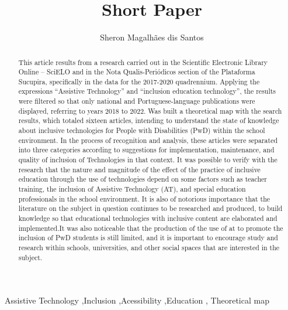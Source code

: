 \documentclass[preprint, 3p,
authoryear]{elsarticle} %
\begin{document}
\begin{frontmatter}

  \title{Short Paper}
    \author[Universidade Federal do Rio Grande]{Sheron Magalhães dis
Santos%
  }
  
  \begin{abstract}
  This article results from a research carried out in the Scientific
  Electronic Library Online -- SciELO and in the Nota Qualis-Periódicos
  section of the Plataforma Sucupira, specifically in the data for the
  2017-2020 quadrennium. Applying the expressions ``Assistive
  Technology'' and ``inclusion education technology'', the results were
  filtered so that only national and Portuguese-language publications
  were displayed, referring to years 2018 to 2022. Was built a
  theoretical map with the search results, which totaled sixteen
  articles, intending to understand the state of knowledge about
  inclusive technologies for People with Disabilities (PwD) within the
  school environment. In the process of recognition and analysis, these
  articles were separated into three categories according to suggestions
  for implementation, maintenance, and quality of inclusion of
  Technologies in that context. It was possible to verify with the
  research that the nature and magnitude of the effect of the practice
  of inclusive education through the use of technologies depend on some
  factors such as teacher training, the inclusion of Assistive
  Technology (AT), and special education professionals in the school
  environment. It is also of notorious importance that the literature on
  the subject in question continues to be researched and produced, to
  build knowledge so that educational technologies with inclusive
  content are elaborated and implemented.It was also noticeable that the
  production of the use of at to promote the inclusion of PwD students
  is still limited, and it is important to encourage study and research
  within schools, universities, and other social spaces that are
  interested in the subject.
  \end{abstract}
    \begin{keyword}
    Assistive
Technology \sep Inclusion \sep Acessibility \sep Education \sep 
    Theoretical map
  \end{keyword}
  
 \end{frontmatter}
\end{document}
